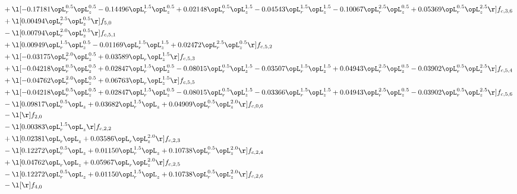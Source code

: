 \begin{alignat}{2}
& + \l[  -0.17181 \opL_r^{0.5} \opL_z^{0.5}   -0.14496 \opL_r^{1.5} \opL_z^{0.5} +  0.02148 \opL_r^{0.5} \opL_z^{1.5}   -0.04543 \opL_r^{1.5} \opL_z^{1.5}   -0.10067 \opL_r^{2.5} \opL_z^{0.5} +  0.05369 \opL_r^{0.5} \opL_z^{2.5}  \r] f_{c,3,6} \nonumber \\ 
& + \l[  0.00494 \opL_r^{2.5} \opL_z^{0.5}  \r] f_{5,0} \nonumber \\ 
& - \l[  0.00794 \opL_r^{2.0} \opL_z^{0.5}  \r] f_{c,5,1} \nonumber \\ 
& + \l[  0.00949 \opL_r^{1.5} \opL_z^{0.5}   -0.01169 \opL_r^{1.5} \opL_z^{1.5} +  0.02472 \opL_r^{2.5} \opL_z^{0.5}  \r] f_{c,5,2} \nonumber \\ 
& + \l[  -0.03175 \opL_r^{2.0} \opL_z^{0.5} +  0.03589 \opL_r \opL_z^{1.5}  \r] f_{c,5,3} \nonumber \\ 
& + \l[  -0.04218 \opL_r^{0.5} \opL_z^{0.5} +  0.02847 \opL_r^{1.5} \opL_z^{0.5}   -0.08015 \opL_r^{0.5} \opL_z^{1.5}   -0.03507 \opL_r^{1.5} \opL_z^{1.5} +  0.04943 \opL_r^{2.5} \opL_z^{0.5}   -0.03902 \opL_r^{0.5} \opL_z^{2.5}  \r] f_{c,5,4} \nonumber \\ 
& + \l[  -0.04762 \opL_r^{2.0} \opL_z^{0.5} +  0.06763 \opL_r \opL_z^{1.5}  \r] f_{c,5,5} \nonumber \\ 
& + \l[  -0.04218 \opL_r^{0.5} \opL_z^{0.5} +  0.02847 \opL_r^{1.5} \opL_z^{0.5}   -0.08015 \opL_r^{0.5} \opL_z^{1.5}   -0.03366 \opL_r^{1.5} \opL_z^{1.5} +  0.04943 \opL_r^{2.5} \opL_z^{0.5}   -0.03902 \opL_r^{0.5} \opL_z^{2.5}  \r] f_{c,5,6} \nonumber \\ 
& - \l[  0.09817 \opL_r^{0.5} \opL_z +  0.03682 \opL_r^{1.5} \opL_z +  0.04909 \opL_r^{0.5} \opL_z^{2.0}  \r] f_{c,0,6} \nonumber \\ 
& - \l[  \r] f_{2,0} \nonumber \\ 
& - \l[  0.00383 \opL_r^{1.5} \opL_z  \r] f_{c,2,2} \nonumber \\ 
& + \l[  0.02381 \opL_r \opL_z +  0.03586 \opL_r \opL_z^{2.0}  \r] f_{c,2,3} \nonumber \\ 
& - \l[  0.12272 \opL_r^{0.5} \opL_z +  0.01150 \opL_r^{1.5} \opL_z +  0.10738 \opL_r^{0.5} \opL_z^{2.0}  \r] f_{c,2,4} \nonumber \\ 
& + \l[  0.04762 \opL_r \opL_z +  0.05967 \opL_r \opL_z^{2.0}  \r] f_{c,2,5} \nonumber \\ 
& - \l[  0.12272 \opL_r^{0.5} \opL_z +  0.01150 \opL_r^{1.5} \opL_z +  0.10738 \opL_r^{0.5} \opL_z^{2.0}  \r] f_{c,2,6} \nonumber \\ 
& - \l[  \r] f_{4,0} \nonumber \\ 

\end{alignat}
